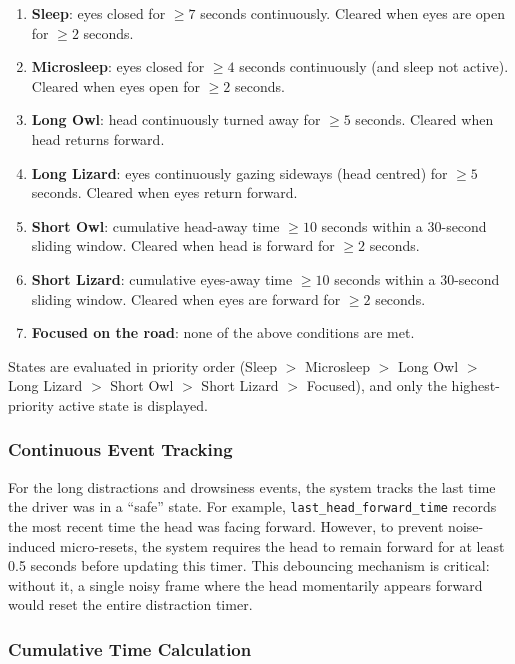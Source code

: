 \documentclass[12pt,a4paper]{article}
\begin{document}
\begin{enumerate}[noitemsep]
    \item \textbf{Sleep}: eyes closed for $\geq 7$ seconds continuously. Cleared when eyes are open for $\geq 2$ seconds.
    \item \textbf{Microsleep}: eyes closed for $\geq 4$ seconds continuously (and sleep not active). Cleared when eyes open for $\geq 2$ seconds.
    \item \textbf{Long Owl}: head continuously turned away for $\geq 5$ seconds. Cleared when head returns forward.
    \item \textbf{Long Lizard}: eyes continuously gazing sideways (head centred) for $\geq 5$ seconds. Cleared when eyes return forward.
    \item \textbf{Short Owl}: cumulative head-away time $\geq 10$ seconds within a 30-second sliding window. Cleared when head is forward for $\geq 2$ seconds.
    \item \textbf{Short Lizard}: cumulative eyes-away time $\geq 10$ seconds within a 30-second sliding window. Cleared when eyes are forward for $\geq 2$ seconds.
    \item \textbf{Focused on the road}: none of the above conditions are met.
\end{enumerate}

States are evaluated in priority order (Sleep $>$ Microsleep $>$ Long Owl $>$ Long Lizard $>$ Short Owl $>$ Short Lizard $>$ Focused), and only the highest-priority active state is displayed.

\subsubsection{Continuous Event Tracking}

For the long distractions and drowsiness events, the system tracks the last time the driver was in a ``safe'' state. For example, \texttt{last\_head\_forward\_time} records the most recent time the head was facing forward. However, to prevent noise-induced micro-resets, the system requires the head to remain forward for at least 0.5 seconds before updating this timer. This debouncing mechanism is critical: without it, a single noisy frame where the head momentarily appears forward would reset the entire distraction timer.

\subsubsection{Cumulative Time Calculation}
\end{document}
